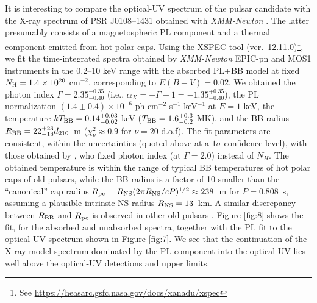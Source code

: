 \documentclass[pdftex,twocolumn]{aastex62}
\newcommand{\gp}[1]{{\color{blue} #1}}
\begin{document}
  
  It is interesting to compare the optical-UV spectrum of the pulsar candidate with the 
  X-ray 
  spectrum of PSR J0108--1431 obtained with \textit{XMM-Newton} \citep{Posselt2012, Arumugasamy2019}. 
  The latter presumably consists of a magnetospheric PL component 
  and a thermal component emitted from 
  hot polar caps. %
  Using the XSPEC tool (ver.\ 12.11.0)\footnote{See \url{https://heasarc.gsfc.nasa.gov/docs/xanadu/xspec}}, we fit
  the time-integrated spectra obtained  by %
  {\sl XMM-Newton} EPIC-pn and MOS1 instruments in the 0.2--10 keV range  with the absorbed PL+BB model at fixed $N_{\rm H}=1.4\times 10^{20}$ cm$^{-2}$, corresponding to $E(B-V)=0.02$.
  We obtained the photon index $\Gamma = 2.35^{+0.35}_{-0.40}$ (i.e., $\alpha_X = -\Gamma +1 = -1.35^{+0.35}_{-0.40} $), the PL normalization 
  $(1.4
  \pm 0.4)\times 10^{-6}$ ph cm$^{-2}$ s$^{-1}$ keV$^{-1}$ at $E=1$ keV, 
  the temperature $kT_{\rm BB} = 0.14^{+0.03}_{-0.02}$
  keV 
  ($T_{\rm BB}=1.6^{+0.3}_{-0.2}$ MK),
  and 
  the BB radius %
  $R_{\rm BB}= 22^{+23}_{-18} d_{210}$~m ($\chi_\nu^2 \approx 0.9$ for $\nu=20$ d.o.f). 
  The fit parameters are consistent, within the uncertainties (quoted above at a $1\sigma$ confidence level),
  with those 
  obtained by \citet{Posselt2012}, who %
  fixed photon index (at $\Gamma=2.0$) instead of $N_H$. 
  The obtained temperature is 
  within the range of typical BB temperatures of hot polar caps of old pulsars, while the BB radius is 
  a factor of 10 smaller than the ``canonical'' cap radius $R_{\rm pc} = R_{\rm NS} (2 \pi R_{\rm NS}/cP)^{1/2} \approx 238$~m for $P=0.808$~s, 
  assuming a 
  plausible intrinsic NS radius 
  $R_{\rm NS}=13$~km.  
  A similar discrepancy between $R_{\rm BB}$ and $R_{\rm pc}$ is observed in other old pulsars \citep[see][and references therein]{2020geppert,Posselt2012}. 
  Figure \ref{fig:8}  
  shows the fit, for the absorbed and unabsorbed spectra, together with the PL fit to the optical-UV spectrum shown in Figure \ref{fig:7}. We see that the continuation of the X-ray model spectrum dominated by the PL component into the optical-UV lies well above the optical-UV detections and upper limits. %
\end{document}

